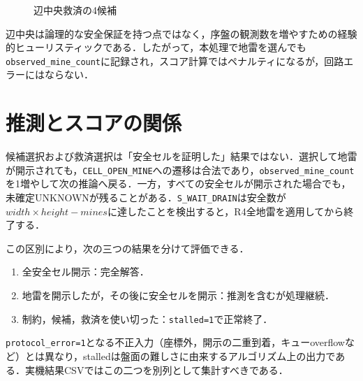 \begin{figure}[tb]
  \centering
  \caption{辺中央救済の4候補}
  \label{fig:edge-rescue}
\end{figure}

辺中央は論理的な安全保証を持つ点ではなく，序盤の観測数を増やすための経験的ヒューリスティックである．したがって，本処理で地雷を選んでも\texttt{observed\_mine\_count}に記録され，スコア計算ではペナルティになるが，回路エラーにはならない．

\section{推測とスコアの関係}
\label{sec:stall-score}

候補選択および救済選択は「安全セルを証明した」結果ではない．選択して地雷が開示されても，\texttt{CELL\_OPEN\_MINE}への遷移は合法であり，\texttt{observed\_mine\_count}を1増やして次の推論へ戻る．一方，すべての安全セルが開示された場合でも，未確定UNKNOWNが残ることがある．\texttt{S\_WAIT\_DRAIN}は安全数が$width\times height-mines$に達したことを検出すると，R4全地雷を適用してから終了する．

この区別により，次の三つの結果を分けて評価できる．
\begin{enumerate}
  \item 全安全セル開示：完全解答．
  \item 地雷を開示したが，その後に安全セルを開示：推測を含むが処理継続．
  \item 制約，候補，救済を使い切った：\texttt{stalled=1}で正常終了．
\end{enumerate}

\texttt{protocol\_error=1}となる不正入力（座標外，開示の二重到着，キューoverflowなど）とは異なり，stalledは盤面の難しさに由来するアルゴリズム上の出力である．実機結果CSVではこの二つを別列として集計すべきである．

